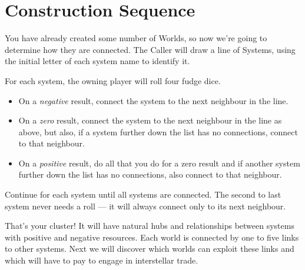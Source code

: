 \section{Construction Sequence}
\label{sec:construction-sequence}

You have already created some number of Worlds, so now we're going to determine how they are connected. The Caller will draw a line of Systems, using the initial letter of each system name to identify it.

For each system, the owning player will roll four fudge dice.

\begin{itemize}
\item On a \emph{negative} result, connect the system to the next neighbour in the line.
\item On a \emph{zero} result, connect the system to the next neighbour in the line as above, but also, if a system further down the list has no connections, connect to that neighbour.
\item On a \emph{positive} result, do all that you do for a zero result and if another system further down the list has no connections, also connect to that neighbour.
\end{itemize}

Continue for each system until all systems are connected. The second to last system never needs a roll --- it will always connect only to its next neighbour.

That's your cluster! It will have natural hubs and relationships between systems with positive and negative resources. Each world is connected by one to five links to other systems. Next we will discover which worlds can exploit these links and which will have to pay to engage in interstellar trade.

